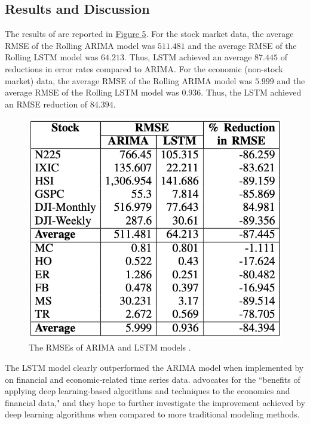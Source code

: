 \documentclass[twoside,11pt]{article}
\begin{document}
\subsection{Results and Discussion}
The results of \cite{siami-namini:2018} are reported in \hyperref[fig:results]{Figure 5}. For the stock market data, the average RMSE of the Rolling ARIMA model was $511.481$ and the average RMSE of the Rolling LSTM model was $64.213$. Thus, LSTM achieved an average $87.445$ of reductions in error rates compared to ARIMA. For the economic (non-stock market) data, the average RMSE of the Rolling ARIMA model was $5.999$ and the average RMSE of the Rolling LSTM model was $0.936$. Thus, the LSTM achieved an RMSE reduction of $84.394$.

\begin{figure}[H]
    \centering
    \includegraphics[scale=0.75]{img/results.png}
    \caption{The RMSEs of ARIMA and LSTM models \citep{siami-namini:2018}.}
    \label{fig:results}
\end{figure}

The LSTM model clearly outperformed the ARIMA model when implemented by \cite{siami-namini:2018} on financial and economic-related time series data. \cite{siami-namini:2018} advocates for the ``benefits of applying deep learning-based algorithms and techniques to the economics and financial data," and they hope to further investigate the improvement achieved by deep learning algorithms when compared to more traditional modeling methods.
\end{document}
